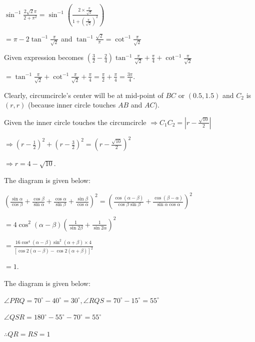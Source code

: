   $\sin^{-1}\frac{2\sqrt{2}\pi}{2 + \pi^{2}} = \sin^{-1}\left(\frac{2\times\frac{\pi}{\sqrt{2}}}{1
  + \left(\frac{\pi}{\sqrt{2}}\right)^2}\right)$

  $= \pi - 2\tan^{-1}\frac{\pi}{\sqrt{2}}$ and $\tan^{-1}\frac{\sqrt{2}}{\pi}
  = \cot^{-1}\frac{\pi}{\sqrt{2}}$

  Given expression becomes $\left(\frac{3}{2} - \frac{2}{4}\right)\tan^{-1}\frac{\pi}{\sqrt{2}}
  + \frac{\pi}{4} + \cot^{-1}\frac{\pi}{\sqrt{2}}$

  $= \tan^{-1}\frac{\pi}{\sqrt{2}} + \cot^{-1}\frac{\pi}{\sqrt{2}} + \frac{\pi}{4} = \frac{\pi}{2}
  + \frac{\pi}{4} = \frac{3\pi}{4}$.
\item Clearly, circumcircle's center will be at mid-point of $BC$ or $(0.5, 1.5)$ and $C_2$ is $(r, r)$
  (because inner circle touches $AB$ and $AC$).

  Given the inner circle touches the circumcircle $\Rightarrow C_1C_2 = \left|r
  - \frac{\sqrt{10}}{2}\right|$

  $\Rightarrow \left(r - \frac{1}{2}\right)^2 + \left(r - \frac{3}{2}\right)^2 = \left(r
  - \frac{\sqrt{10}}{2}\right)^2$

  $\Rightarrow r = 4 - \sqrt{10}$.

  The diagram is given below:

  \startplacefigure
    \externalfigure[17_28.pdf]
  \stopplacefigure
\item $\left(\frac{\sin\alpha}{\cos\beta} + \frac{\cos\beta}{\sin\alpha} + \frac{\cos\alpha}{\sin\beta}
  + \frac{\sin\beta}{\cos\alpha}\right)^{2} = \left(\frac{\cos(\alpha - \beta)}{\cos\beta\sin\beta}
  + \frac{\cos(\beta - \alpha)}{\sin\alpha\cos\alpha}\right)^{2}$

  $= 4\cos^{2}(\alpha - \beta)\left(\frac{1}{\sin2\beta} + \frac{1}{\sin2\alpha}\right)^2$

  $= \frac{16\cos^4(\alpha - \beta)\sin^2(\alpha + \beta)\times 4}{\left[\cos2(\alpha - \beta)
      - \cos2(\alpha + \beta)\right]^2}$

  $= 1$.
\item The diagram is given below:

  \startplacefigure
    \externalfigure[17_29.pdf]
  \stopplacefigure

  $\angle PRQ = 70^\circ - 40^\circ = 30^\circ, \angle RQS = 70^\circ - 15^\circ = 55^\circ$

  $\angle QSR = 180^\circ - 55^\circ - 70^\circ = 55^\circ$

  $\therefore QR = RS = 1$

